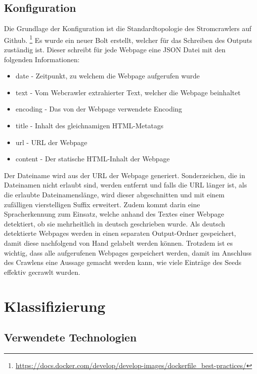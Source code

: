 \subsection{Konfiguration}
Die Grundlage der Konfiguration ist die Standardtopologie des Stromcrawlers auf Github.
\footnote{\url{https://docs.docker.com/develop/develop-images/dockerfile_best-practices/}}
Es wurde ein neuer Bolt erstellt, welcher für das Schreiben des Outputs zuständig ist.
Dieser schreibt für jede Webpage eine JSON Datei mit den folgenden Informationen:
\begin{itemize}
	\item \glqq date \grqq  - Zeitpunkt, zu welchem die Webpage aufgerufen wurde
	\item \glqq text \grqq  - Vom Webcrawler extrahierter Text, welcher die Webpage beinhaltet
	\item \glqq encoding \grqq  - Das von der Webpage verwendete Encoding
	\item \glqq title \grqq  - Inhalt des gleichnamigen HTML-Metatags
	\item \glqq url \grqq  - URL der Webpage
	\item \glqq content \grqq  - Der statische HTML-Inhalt der Webpage	
\end{itemize}
Der Dateiname wird aus der URL der Webpage generiert. 
Sonderzeichen, die in Dateinamen nicht erlaubt sind, werden entfernt und falls die URL länger ist, als die erlaubte Dateinamenslänge, wird dieser abgeschnitten und mit einem zufälligen vierstelligen Suffix erweitert.
Zudem kommt darin eine Spracherkennung zum Einsatz, welche anhand des Textes einer Webpage detektiert, ob sie mehrheitlich in deutsch geschrieben wurde.
Als deutsch detektierte Webpages werden in einen separaten Output-Ordner gespeichert, damit diese nachfolgend von Hand gelabelt werden können.
Trotzdem ist es wichtig, dass alle aufgerufenen Webpages gespeichert werden, damit im Anschluss des Crawlens eine Aussage gemacht werden kann, wie viele Einträge des Seeds effektiv gecrawlt wurden.

\section{Klassifizierung}
\subsection{Verwendete Technologien}

